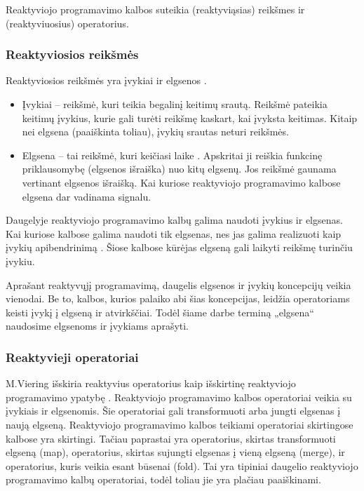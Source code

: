 Reaktyviojo programavimo kalbos suteikia (reaktyviąsias) reikšmes ir (reaktyviuosius) operatorius.

\subsubsection{Reaktyviosios reikšmės}

Reaktyviosios reikšmės yra įvykiai ir elgsenos \cite{Bainomugisha:2013:SRP:2501654.2501666}.

\begin{itemize}
  \item Įvykiai – reikšmė, kuri teikia begalinį keitimų srautą. Reikšmė pateikia keitimų įvykius, kurie gali turėti reikšmę kaskart, kai įvyksta keitimas. Kitaip nei elgsena (paaiškinta toliau), įvykių srautas neturi reikšmės.
  \item Elgsena – tai reikšmė, kuri keičiasi laike \cite{ElliottHudak97:Fran}. Apskritai ji reiškia funkcinę priklausomybę (elgsenos išraiška) nuo kitų elgsenų. Jos reikšmė gaunama vertinant elgsenos išraišką. Kai kuriose reaktyviojo programavimo kalbose elgsena dar vadinama signalu.
\end{itemize}

Daugelyje reaktyviojo programavimo kalbų galima naudoti įvykius ir elgsenas. Kai kuriose kalbose galima naudoti tik elgsenas, nes jas galima realizuoti kaip įvykių apibendrinimą \cite{Wan2002:EventDrivenFRP, CzaplickiC13:FRPGUI}. Šiose kalbose kūrėjas elgseną gali laikyti reikšmę turinčiu įvykiu.

Aprašant reaktyvųjį programavimą, daugelis elgsenos ir įvykių koncepcijų veikia vienodai. Be to, kalbos, kurios palaiko abi šias koncepcijas, leidžia operatoriams keisti įvykį į elgseną ir atvirkščiai. Todėl šiame darbe terminą „elgsena“ naudosime elgsenoms ir įvykiams aprašyti.

\subsubsection{Reaktyvieji operatoriai}

M.Viering išskiria reaktyvius operatorius kaip išskirtinę reaktyviojo programavimo ypatybę \cite{RubyReactiveMaster}. Reaktyviojo programavimo kalbos operatoriai veikia su įvykiais ir elgsenomis. Šie operatoriai gali transformuoti arba jungti elgsenas į naują elgseną. Reaktyviojo programavimo kalbos teikiami operatoriai skirtingose kalbose yra skirtingi. Tačiau paprastai yra operatorius, skirtas transformuoti elgseną (map), operatorius, skirtas sujungti elgsenas į vieną elgseną (merge), ir operatorius, kuris veikia esant būsenai (fold). Tai yra tipiniai daugelio reaktyviojo programavimo kalbų operatoriai, todėl toliau jie yra plačiau paaiškinami.

